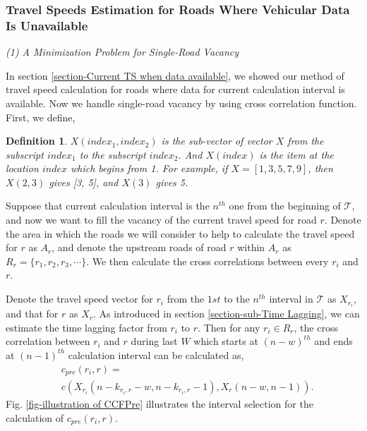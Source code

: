\documentclass[twocolumn,10pt,final,conference]{IEEEtran}
\newtheorem{defn}{Definition}
\begin{document}
\subsubsection{Travel Speeds Estimation for Roads Where Vehicular Data Is Unavailable}\label{section-Instant Travel Speed Estimation}
\quad

\emph{(1) A Minimization Problem for Single-Road Vacancy}
\quad

In section \ref{section-Current TS when data available}, we showed our method of travel speed calculation for roads where data for current calculation interval is available. Now we handle single-road vacancy by using cross correlation function.
First, we define,
\begin{defn}
$X(index_1,index_2)$ is the sub-vector of vector $X$ from the subscript  $index_1$ to the subscript $index_2$.  And $X(index)$ is the item at the location $index$ which begins from 1. For example, if $X=[1,3,5,7,9]$, then $X(2,3)$ gives [3, 5], and $X(3)$ gives 5.
\end{defn}

Suppose that current calculation interval is the $n^{th}$ one from the beginning of $\mathcal{T}$, and now we want to fill the vacancy of the current travel speed for road $r$. Denote the area in which the roads we will consider to help to calculate the travel speed for $r$ as $A_r$, and denote the upstream roads of road $r$ within $A_r$ as $R_r=\{r_1, r_2, r_3, \cdots\}$. We then calculate the cross correlations between every $r_i$ and $r$.

Denote the travel speed vector for $r_i$ from the $1st$ to the $n^{th}$ interval in $\mathcal{T}$ as $X_{r_i}$, and that for $r$ as $X_r$. As introduced in section \ref{section-sub-Time Lagging}, we can estimate the time lagging factor from $r_i$ to $r$. Then for any $r_i\in R_r$, the cross correlation between $r_i$ and $r$ during last $W$ which starts at $(n-w)^{th}$ and ends at $(n-1)^{th}$ calculation interval can be calculated as,
\begin{equation}\label{equ-cPre(ri,r)}
\begin{split}
& c_{pre}(r_i,r)=\\
& c(X_{r_i}(n-k_{r_i,r}-w,n-k_{r_i,r}-1),X_r(n-w,n-1)).
\end{split}
\end{equation}
Fig. \ref{fig-illustration of CCFPre} illustrates the interval selection for the calculation of $c_{pre}(r_i,r)$.
\end{document}
